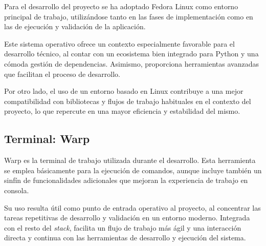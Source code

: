 Para el desarrollo del proyecto se ha adoptado Fedora Linux \cite{fedora} como entorno principal de trabajo, 
utilizándose tanto en las fases de implementación como en las de ejecución y validación de la aplicación.

Este sistema operativo ofrece un contexto especialmente favorable para el desarrollo técnico, al contar con 
un ecosistema bien integrado para Python y una cómoda gestión de dependencias. Asimismo, proporciona herramientas 
avanzadas que facilitan el proceso de desarrollo.

Por otro lado, el uso de un entorno basado en Linux contribuye a una mejor compatibilidad con bibliotecas y flujos 
de trabajo habituales en el contexto del proyecto, lo que repercute 
en una mayor eficiencia y estabilidad del mismo.

\subsection{Terminal: Warp}

Warp \cite{warp} es la terminal de trabajo utilizada durante el desarrollo. 
Esta herramienta se emplea básicamente para la ejecución de comandos, 
aunque incluye también un sinfín de funcionalidades adicionales que mejoran la 
experiencia de trabajo en consola.

Su uso resulta útil como punto de entrada operativo al proyecto, al concentrar
las tareas repetitivas de desarrollo y validación en un entorno moderno. 
Integrada con el resto del \textit{stack}, facilita un flujo de trabajo más ágil y 
una interacción directa y continua con las herramientas de desarrollo y ejecución del sistema.